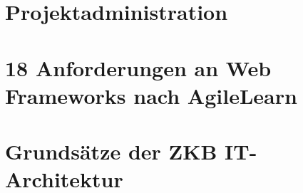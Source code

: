 \documentclass[
11pt, %
a4paper, %
BCOR25mm, %
DIV14, %
footsepline = false, %
headsepline, %
twoside, %
openright,
abstracton, %
listof=totocnumbered, %
bibliography=totocnumbered %
]{scrreprt}
\begin{document}
  \cleardoublepage
   
    
  \chapter{Projektadministration}\label{chapter:Projektadministration}
 
  

  \cleardoublepage
   
    
  \chapter{18 Anforderungen an Web Frameworks nach
  AgileLearn}\label{chapter:18AnforderungenNachAgileLearn}
 
  

  \cleardoublepage
   
    
  \chapter{Grundsätze der ZKB
  IT-Architektur}\label{chapter:GrundsaetzeDerZkbItArchitektur}
 
  

  \cleardoublepage

 
 
\end{document}
